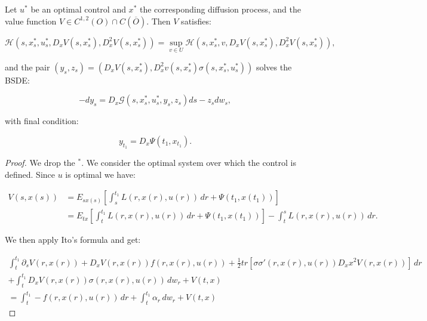 \begin{theorem}\label{2-3-stochmaxprinc}
    Let $u^{\ast}$ be an optimal control and $x^{\ast}$ the corresponding diffusion process, and the value function 
    $V\in C^{1,2}(O)\cap C(\overline{O})$. Then $V$ satisfies:
    
    \begin{equation}\label{2-3-maxcond}
        \mathcal{H}(s,x_s^{\ast}, u_s^{\ast}, D_xV(s,x^{\ast}_s), D_x^2V(s,x^{\ast}_s)) = \sup_{v \in U}\mathcal{H}(s,x_s^{\ast}, v, D_xV(s,x^{\ast}_s), D_x^2V(s,x^{\ast}_s)),
    \end{equation}

    and the pair $(y_s,z_s)=\left(D_xV(s,x_s^{\ast}),D_x^2v(s,x_s^{\ast})\sigma(s,x_s^{\ast},u_s^{\ast})\right)$ solves the BSDE:

    \begin{equation}\label{2-3-maxprinc-BSDE}
        -dy_s = D_x\mathcal{G}(s,x_s^{\ast}, u_s^{\ast}, y_s, z_s)ds - z_sdw_s,
    \end{equation}

    with final condition:

    \begin{equation}\label{2-3-maxprinc-finalcond}
        y_{t_1} = D_x\Psi(t_1,x_{t_1}).
    \end{equation}

    \begin{proof}
        We drop the $^{\ast}$. We consider the optimal system over which the control is defined. 
        Since $u$ is optimal we have:

        \begin{align}
            V(s,x(s)) & = E_{sx(s)}\left[\int_s^{t_1} L(r,x(r),u(r))\,dr + \Psi(t_1,x(t_1))\right] \\ 
            & = E_{tx}\left[\int_t^{t_1} L(r,x(r),u(r))\,dr + \Psi(t_1,x(t_1))\right] - \int_t^s L(r,x(r),u(r))\,dr.  
        \end{align}

        We then apply Ito's formula and get:

        \begin{align}
            \int_t^{t_1} \partial_sV(r,x(r)) + D_xV(r,x(r))f(r,x(r),u(r)) + \frac{1}{2}tr\left[\sigma\sigma'(r,x(r),u(r))D_xx^2V(r,x(r))\right] \,dr \\
            + \int_t^{t_1} D_xV(r,x(r))\sigma(r,x(r),u(r))\,dw_r + V(t,x) \\
            = \int_t^{t_1} -f(r,x(r),u(r))\,dr + \int_t^{t_1}\alpha_r\,dw_r + V(t,x)
        \end{align}


\end{proof}
\end{theorem}
